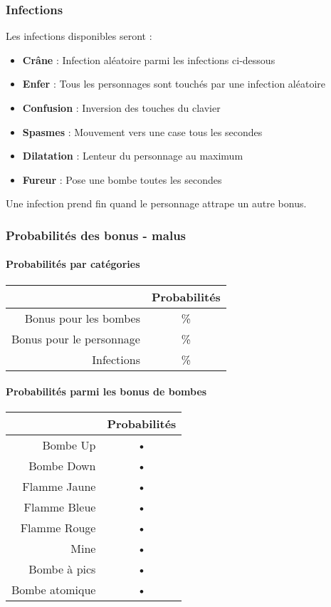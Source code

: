 \subsubsection{Infections}

Les infections disponibles seront :
\begin{itemize}
\item \textbf{Crâne} : Infection aléatoire parmi les infections ci-dessous
\item \textbf{Enfer} : Tous les personnages sont touchés par une infection aléatoire
\item \textbf{Confusion} : Inversion des touches du clavier
\item \textbf{Spasmes} : Mouvement vers une case tous les \nbSecondes secondes
\item \textbf{Dilatation} : Lenteur du personnage au maximum
\item \textbf{Fureur} : Pose une bombe toutes les \nbSecondes secondes
\end{itemize}

Une infection prend fin quand le personnage attrape un autre bonus.

\subsubsection{Probabilités des bonus - malus}

\paragraph{Probabilités par catégories}
\begin{center}
\begin{tabular}{|r|c|}
\hline 
& Probabilités \\ 
\hline 
Bonus pour les bombes & \% \\ 
\hline 
Bonus pour le personnage & \% \\ 
\hline 
Infections & \% \\ 
\hline 
\end{tabular} 
\end{center}

\paragraph{Probabilités parmi les bonus de bombes}
\begin{center}
\begin{tabular}{|r|c|}
\hline 
& Probabilités \\ 
\hline 
Bombe Up & • \\ 
\hline 
Bombe Down & • \\ 
\hline 
Flamme Jaune & • \\ 
\hline 
Flamme Bleue & • \\ 
\hline 
Flamme Rouge & • \\ 
\hline 
Mine & • \\ 
\hline 
Bombe à pics & • \\ 
\hline 
Bombe atomique & • \\ 
\hline 
\end{tabular} 
\end{center}

